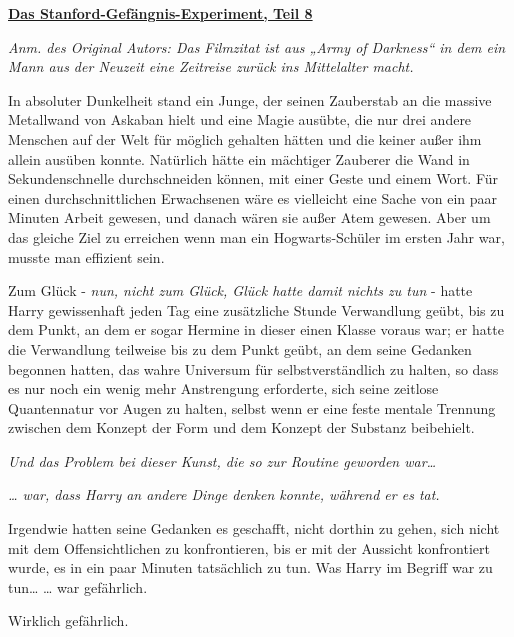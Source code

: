 

\hypertarget{das-stanford-gefuxe4ngnis-experiment-teil-8}{%

\textbf{\uline{Das Stanford-Gefängnis-Experiment, Teil 8}}

\emph{Anm. des Original Autors: Das Filmzitat ist aus „Army of Darkness“ in dem ein Mann aus der Neuzeit eine Zeitreise zurück ins Mittelalter macht.}

In absoluter Dunkelheit stand ein Junge, der seinen Zauberstab an die massive Metallwand von Askaban hielt und eine Magie ausübte, die nur drei andere Menschen auf der Welt für möglich gehalten hätten und die keiner außer ihm allein ausüben konnte. Natürlich hätte ein mächtiger Zauberer die Wand in Sekundenschnelle durchschneiden können, mit einer Geste und einem Wort. Für einen durchschnittlichen Erwachsenen wäre es vielleicht eine Sache von ein paar Minuten Arbeit gewesen, und danach wären sie außer Atem gewesen. Aber um das gleiche Ziel zu erreichen wenn man ein Hogwarts-Schüler im ersten Jahr war, musste man effizient sein.

Zum Glück - \emph{nun, nicht zum Glück, Glück hatte damit nichts zu tun} - hatte Harry gewissenhaft jeden Tag eine zusätzliche Stunde Verwandlung geübt, bis zu dem Punkt, an dem er sogar Hermine in dieser einen Klasse voraus war; er hatte die Verwandlung teilweise bis zu dem Punkt geübt, an dem seine Gedanken begonnen hatten, das wahre Universum für selbstverständlich zu halten, so dass es nur noch ein wenig mehr Anstrengung erforderte, sich seine zeitlose Quantennatur vor Augen zu halten, selbst wenn er eine feste mentale Trennung zwischen dem Konzept der Form und dem Konzept der Substanz beibehielt.

\emph{Und das Problem bei dieser Kunst, die so zur Routine geworden war…}

\emph{… war, dass Harry an andere Dinge denken konnte, während er es tat.}

Irgendwie hatten seine Gedanken es geschafft, nicht dorthin zu gehen, sich nicht mit dem Offensichtlichen zu konfrontieren, bis er mit der Aussicht konfrontiert wurde, es in ein paar Minuten tatsächlich zu tun. Was Harry im Begriff war zu tun… … war gefährlich.

Wirklich gefährlich.

}
